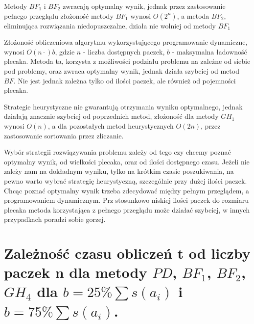 \documentclass[polish,polish,a4paper]{article}
\begin{document}
\begin{spacing}{1.35}
	Metody $BF_{1}$ i $BF_{2}$ zwracają optymalny wynik, jednak przez zastosowanie pełnego przeglądu złożoność metody $BF_{1}$ wynosi $O(2^{n})$, a metoda $BF_{2}$, eliminująca rozwiązania niedopuszczalne, działa nie wolniej od metody $BF_{1}$
	
	Złożoność obliczeniowa algorytmu wykorzystującego programowanie dynamiczne, wynosi $O(n \cdot) b$, gdzie $n$ - liczba dostępnych paczek, $b$ - maksymalna ładowność plecaka. Metoda ta, korzysta z możliwości podziału problemu na zależne od siebie pod problemy, oraz zwraca optymalny wynik, jednak działa szybciej od metod $BF$. Nie jest jednak zależna tylko od ilości paczek, ale również od pojemności plecaka.
	
	Strategie heurystyczne nie gwarantują otrzymania wyniku optymalnego, jednak działają znacznie szybciej od poprzednich metod, złożoność dla metody $GH_{1}$ wynosi $O(n)$, a dla pozostałych metod heurystycznych $O(2n)$, przez zastosowanie sortowania przez zliczanie.
	
	Wybór strategii rozwiązywania problemu zależy od tego czy chcemy poznać optymalny wynik, od wielkości plecaka, oraz od ilości dostępnego czasu.
	Jeżeli nie zależy nam na dokładnym wyniku, tylko na krótkim czasie poszukiwania, na pewno warto wybrać strategię heurystyczną, szczególnie przy dużej ilości paczek.
	Chcąc poznać optymalny wynik trzeba zdecydować między pełnym przeglądem, a programowaniem dynamicznym. Prz stosunkowo niskiej ilości paczek do rozmiaru plecaka metoda korzystająca z pełnego przeglądu może działać szybciej, w innych przypadkach poradzi sobie gorzej.
	
	
	\section{Zależność czasu obliczeń t od liczby paczek n dla metody $PD$, $BF_{1}$, $BF_{2}$, $GH_{4}$ dla $b = 25 \% \sum s (a_{i})$ i $b = 75 \% \sum s (a_{i})$. }
	
		
	
	\begin{figure}[H]
		{\centering
}
\end{figure}
\end{spacing}
\end{document}
